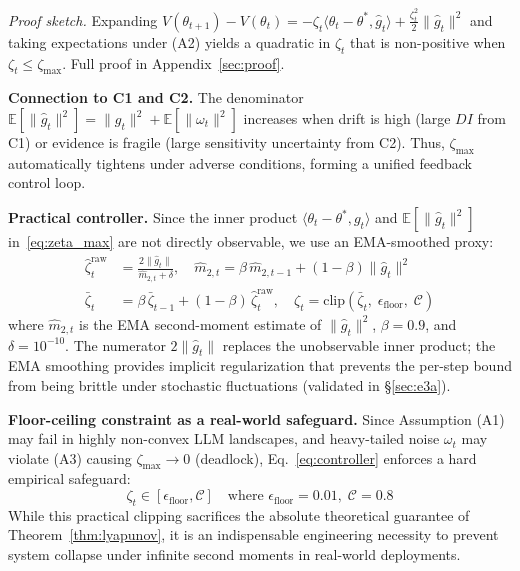 \documentclass{article}
\begin{document}
\textit{Proof sketch.} Expanding
$V(\theta_{t+1}) - V(\theta_t) = -\zeta_t \langle \theta_t - \theta^*,
\hat{g}_t \rangle + \tfrac{\zeta_t^2}{2}\|\hat{g}_t\|^2$ and taking
expectations under (A2) yields a quadratic in $\zeta_t$ that is
non-positive when $\zeta_t \leq \zeta_{\max}$.
Full proof in Appendix~\ref{sec:proof}.

\textbf{Connection to C1 and C2.} The denominator
$\mathbb{E}[\|\hat{g}_t\|^2] = \|g_t\|^2 + \mathbb{E}[\|\omega_t\|^2]$
increases when drift is high (large $DI$ from C1) or evidence is
fragile (large sensitivity uncertainty from C2). Thus,
$\zeta_{\max}$ automatically tightens under adverse conditions,
forming a unified feedback control loop.

\textbf{Practical controller.} Since the inner product
$\langle \theta_t{-}\theta^*, g_t \rangle$ and $\mathbb{E}[\|\hat{g}_t\|^2]$
in~\eqref{eq:zeta_max} are not directly observable, we use an
EMA-smoothed proxy:
\begin{align}
  \hat{\zeta}^{\text{raw}}_t
    &= \frac{2\|\hat{g}_t\|}{\hat{m}_{2,t} + \delta},
    \quad
    \hat{m}_{2,t} = \beta\,\hat{m}_{2,t-1}
      + (1{-}\beta)\|\hat{g}_t\|^2
    \label{eq:zeta-raw} \\
  \bar{\zeta}_t &= \beta\,\bar{\zeta}_{t-1}
    + (1{-}\beta)\,\hat{\zeta}^{\text{raw}}_t,
    \quad
    \zeta_t = \mathrm{clip}(\bar{\zeta}_t,\;
      \epsilon_{\text{floor}},\; \mathcal{C})
    \label{eq:controller}
\end{align}
where $\hat{m}_{2,t}$ is the EMA second-moment estimate of
$\|\hat{g}_t\|^2$, $\beta{=}0.9$, and $\delta{=}10^{-10}$.
The numerator $2\|\hat{g}_t\|$ replaces the unobservable inner
product; the EMA smoothing provides implicit regularization that
prevents the per-step bound from being brittle under stochastic
fluctuations (validated in \S\ref{sec:e3a}).

\textbf{Floor-ceiling constraint as a real-world safeguard.}
\label{par:heavytail}
Since Assumption (A1) may fail in highly non-convex LLM landscapes, and heavy-tailed noise $\omega_t$ may violate (A3) causing $\zeta_{\max} \to 0$ (deadlock), Eq.~\eqref{eq:controller} enforces a hard empirical safeguard:
\begin{equation}
  \zeta_t \in [\epsilon_{\text{floor}}, \mathcal{C}]
  \quad \text{where } \epsilon_{\text{floor}} = 0.01,\;
  \mathcal{C} = 0.8
  \label{eq:floor}
\end{equation}
While this practical clipping sacrifices the absolute theoretical guarantee of Theorem~\ref{thm:lyapunov}, it is an indispensable engineering necessity to prevent system collapse under infinite second moments in real-world deployments.
\end{document}
